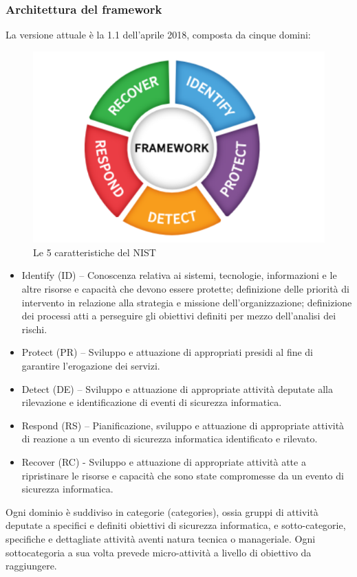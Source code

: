 \subsubsection{Architettura del framework}
La versione attuale è la 1.1 dell’aprile 2018, composta da cinque domini:
\begin{figure}[H]
    \centering
    \includegraphics[scale=0.6]{Immagini/img4.png}
    \caption{Le 5 caratteristiche del NIST}
    \label{fig:caratteristicheNist}
\end{figure}
\begin{itemize}
    \item Identify (ID) – Conoscenza relativa ai sistemi, tecnologie, informazioni e le altre risorse e capacità che devono essere protette; definizione delle priorità di intervento in relazione alla strategia e missione dell’organizzazione; definizione dei processi atti a perseguire gli obiettivi definiti per mezzo dell’analisi dei rischi.
    \item Protect (PR) – Sviluppo e attuazione di appropriati presidi al fine di garantire l’erogazione dei servizi.
    \item Detect (DE) – Sviluppo e attuazione di appropriate attività deputate alla rilevazione e identificazione di eventi di sicurezza informatica.
    \item Respond (RS) – Pianificazione, sviluppo e attuazione di appropriate attività di reazione a un evento di sicurezza informatica identificato e rilevato.
    \item Recover (RC) - Sviluppo e attuazione di appropriate attività atte a ripristinare le risorse e capacità che sono state compromesse da un evento di sicurezza informatica.
\end{itemize}
Ogni dominio è suddiviso in categorie (categories), ossia gruppi di attività deputate a specifici e definiti obiettivi di sicurezza informatica, e sotto-categorie, specifiche e dettagliate attività aventi natura tecnica o manageriale. Ogni sottocategoria a sua volta prevede micro-attività a livello di obiettivo da raggiungere.

